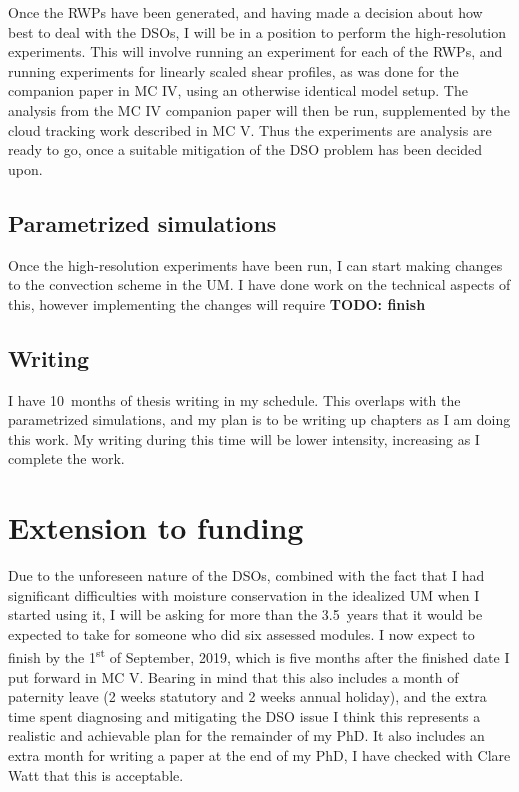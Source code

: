 \documentclass[11pt,a4paper]{article}
\newcommand{\ts}{\textsuperscript}
\newcommand\todo[1]{\textbf{TODO: #1}}
\begin{document}
Once the RWPs have been generated, and having made a decision about how best to deal with the DSOs, I will be in a position to perform the high-resolution experiments. This will involve running an experiment for each of the RWPs, and running experiments for linearly scaled shear profiles, as was done for the companion paper in MC IV, using an otherwise identical model setup. The analysis from the MC IV companion paper will then be run, supplemented by the cloud tracking work described in MC V. Thus the experiments are analysis are ready to go, once a suitable mitigation of the DSO problem has been decided upon.

\subsection{Parametrized simulations}
\label{sec:Parametrized simulations}

Once the high-resolution experiments have been run, I can start making changes to the convection scheme in the UM. I have done work on the technical aspects of this, however implementing the changes will require \todo{finish}

\subsection{Writing}
\label{sec:Writing}

I have \SI{10}{months} of thesis writing in my schedule. This overlaps with the 
parametrized simulations, and my plan is to be writing up chapters as I am doing this work. My writing during this time will be lower intensity, increasing as I complete the work. 

\section{Extension to funding}
\label{sec:extension}

Due to the unforeseen nature of the DSOs, combined with the fact that I had significant difficulties with moisture conservation in the idealized UM when I started using it, I will be asking for more than the \SI{3.5}{years} that it would be expected to take for someone who did six assessed modules. 
I now expect to finish by the 1\ts{st} of September, 2019, which is five months after the finished date I put forward in MC V. Bearing in mind that this also includes a month of paternity leave (2 weeks statutory and 2 weeks annual holiday), and the extra time spent diagnosing and mitigating the DSO issue I think this represents a realistic and achievable plan for the remainder of my PhD. It also includes an extra month for writing a paper at the end of my PhD, I have checked with Clare Watt that this is acceptable.
\end{document}
